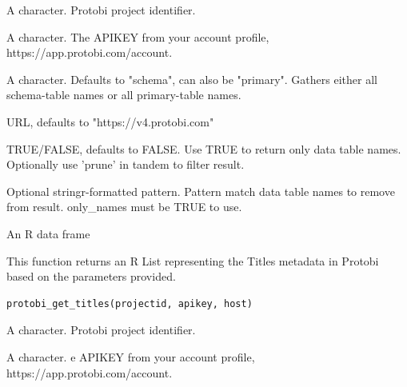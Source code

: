 \documentclass[a4paper]{book}
\begin{document}
%
\begin{Arguments}
\begin{ldescription}
\item[\code{projectid}] A character. Protobi project identifier.

\item[\code{apikey}] A character. The APIKEY from your account profile, https://app.protobi.com/account.

\item[\code{scopekey}] A character. Defaults to "schema", can also be "primary". Gathers either all schema-table names or all primary-table names.

\item[\code{host}] URL, defaults to "https://v4.protobi.com"

\item[\code{only\_names}] TRUE/FALSE, defaults to FALSE. Use TRUE to return only data table names. Optionally use 'prune' in tandem to filter result.

\item[\code{prune}] Optional stringr-formatted pattern. Pattern match data table names to remove from result. only\_names must be TRUE to use.
\end{ldescription}
\end{Arguments}
%
\begin{Value}
An R data frame
\end{Value}
%
\begin{Description}\relax
This function returns an R List representing the Titles metadata in Protobi based on the parameters provided.
\end{Description}
%
\begin{Usage}
\begin{verbatim}
protobi_get_titles(projectid, apikey, host)
\end{verbatim}
\end{Usage}
%
\begin{Arguments}
\begin{ldescription}
\item[\code{projectid}] A character. Protobi project identifier.

\item[\code{apikey}] A character. e APIKEY from your account profile, https://app.protobi.com/account.
\end{ldescription}
\end{Arguments}
\end{document}
